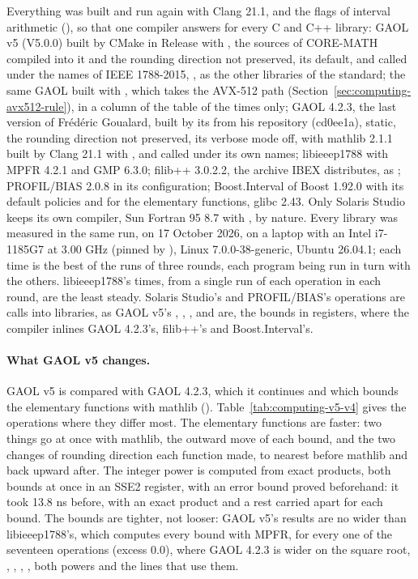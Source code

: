 \documentclass[12pt,a4paper,twoside,openright]{book}
\begin{document}
Everything was built and run again with Clang 21.1,  and
the flags of interval arithmetic (), so that one
compiler answers for every C and C++ library: GAOL v5 (V5.0.0) built by
CMake in Release with , the sources of CORE-MATH compiled
into it and the rounding direction not preserved, its default, and called
under the names of IEEE 1788-2015, , as the other
libraries of the standard; the same GAOL built with
, which takes the AVX-512 path
(Section~\ref{sec:computing-avx512-rule}), in a column of the table of the
times only; GAOL 4.2.3, the last version of Fr\'ed\'eric Goualard, built
by its  from his repository (cd0ee1a), static, the rounding
direction not preserved, its verbose mode off, with mathlib 2.1.1 built by
Clang 21.1 with , and called under its
own names; libieeep1788 with MPFR 4.2.1 and GMP 6.3.0; filib++ 3.0.2.2, the
archive IBEX distributes, as
;
PROFIL/BIAS 2.0.8 in its  configuration;
Boost.Interval of Boost 1.92.0 with its default policies and
 for the elementary functions, glibc 2.43. Only
Solaris Studio keeps its own compiler, Sun Fortran 95 8.7 with
, by nature. Every library was measured in the same run, on
17 October 2026, on a laptop with an Intel i7-1185G7 at 3.00 GHz (pinned by
), Linux 7.0.0-38-generic, Ubuntu 26.04.1; each time is
the best of the runs of three rounds, each program being run in turn with
the others. libieeep1788's times, from a single run of each operation in
each round, are the least steady. Solaris Studio's and PROFIL/BIAS's
operations are calls into libraries, as GAOL v5's \code{+}, \code{-},
\code{*}, \code{/} and  are, the bounds in registers, where the
compiler inlines GAOL 4.2.3's, filib++'s and Boost.Interval's.

\paragraph{What GAOL v5 changes.}
GAOL v5 is compared with GAOL 4.2.3, which it continues and which bounds
the elementary functions with mathlib ().
Table~\ref{tab:computing-v5-v4} gives the operations where they differ
most. The elementary functions are faster:\newinvfive{} two things go at
once with mathlib, the outward move of each bound, and the two changes of
rounding direction each function made, to nearest before mathlib and back
upward after. The integer power is computed from exact products, both
bounds at once in an SSE2 register, with an error bound proved beforehand:
it took 13.8 ns before, with an exact product and a rest carried apart for
each bound. The bounds are tighter, not looser: GAOL v5's results are no
wider than libieeep1788's, which computes every bound with MPFR, for every
one of the seventeen operations (excess $0.0$), where GAOL 4.2.3 is wider
on the square root, , , , , both
powers and the lines that use them.
\end{document}
